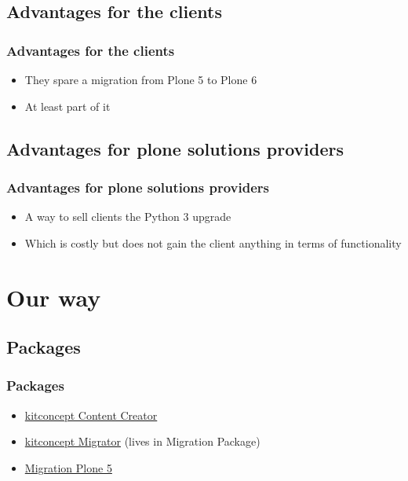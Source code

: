 \documentclass[aspectratio=169]{beamer}
\begin{document}
\subsection{Advantages for the clients}
\begin{frame}
  \frametitle{Advantages for the clients}
  \begin{itemize}
    \item They spare a migration from Plone 5 to Plone 6 \pause
    \item At least part of it
  \end{itemize}
\end{frame}

\subsection{Advantages for plone solutions providers}
\begin{frame}
  \frametitle{Advantages for plone solutions providers}
  \begin{itemize}
    \item A way to sell clients the Python 3 upgrade \pause
    \item Which is costly but does not gain the client anything in terms of functionality
  \end{itemize}
\end{frame}

\section{Our way}
\subsection{Packages}
\begin{frame}
  \frametitle{Packages}
  \begin{itemize}
    \item \href{https://github.com/kitconcept/kitconcept.contentcreator}{kitconcept Content Creator} \pause
    \item \href{https://github.com/kitconcept/migration-plone5/tree/master/src/kitconcept.migrator}{kitconcept Migrator} (lives in Migration Package) \pause
    \item \href{https://github.com/kitconcept/migration-plone5}{Migration Plone 5}
  \end{itemize}
\end{frame}
\end{document}
